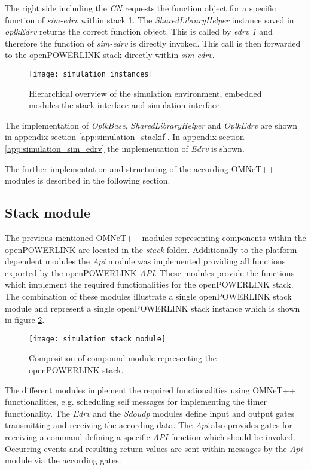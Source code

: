 The right side including the \emph{CN} requests the function object for a specific function of \emph{sim-edrv} within stack 1.
The \emph{SharedLibraryHelper} instance saved in \emph{oplkEdrv} returns the correct function object.
This is called by \emph{edrv 1} and therefore the function of \emph{sim-edrv} is directly invoked.
This call is then forwarded to the openPOWERLINK stack directly within \emph{sim-edrv}.

\begin{figure}
    \centering
    \texttt{[image: simulation\_instances]}
    \caption{Hierarchical overview of the simulation environment, embedded modules the stack interface and simulation interface.}
    \label{fig:simulation_instances}
\end{figure}

The implementation of \emph{OplkBase}, \emph{SharedLibraryHelper} and \emph{OplkEdrv} are shown in appendix section \ref{app:simulation_stackif}.
In appendix section \ref{app:simulation_sim_edrv} the implementation of \emph{Edrv} is shown.

The further implementation and structuring of the according OMNeT++ modules is described in the following section.

\subsection{Stack module}
\label{sec:porting_stack_stackmodule}

The previous mentioned OMNeT++ modules representing components within the openPOWERLINK are located in the \emph{stack} folder.
Additionally to the platform dependent modules the \emph{Api} module was implemented providing all functions exported by the openPOWERLINK \emph{API}.
These modules provide the functions which implement the required functionalities for the openPOWERLINK stack.
The combination of these modules illustrate a single openPOWERLINK stack module and represent a single openPOWERLINK stack instance which is shown in figure \ref{fig:simulation_stack_module}.

\begin{figure}
    \centering
    \texttt{[image: simulation\_stack\_module]}
    \caption{Composition of compound module representing the openPOWERLINK stack.}
    \label{fig:simulation_stack_module}
\end{figure}

\begin{sloppypar}
The different modules implement the required functionalities using OMNeT++ functionalities, e.g. scheduling self messages for implementing the timer functionality.
The \emph{Edrv} and the \emph{Sdoudp} modules define input and output gates transmitting and receiving the according data.
The \emph{Api} also provides gates for receiving a command defining a specific \emph{API} function which should be invoked.
Occurring events and resulting return values are sent within messages by the \emph{Api} module via the according gates.
\end{sloppypar}

